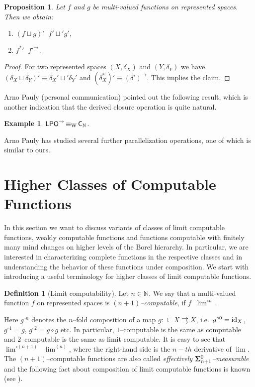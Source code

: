 \documentclass[a4paper]{amsart}
\def\IN{{\mathbb{N}}}
\def\In{\subseteq}
\def\mto{\rightrightarrows}
\def\id{{\rm id}}
\newcommand{\SO}[1]{{{\bf\Sigma}^0_{#1}}}
\def\LPO{\text{\rm\sffamily LPO}}
\def\C{\mbox{\rm\sffamily C}}
\def\LPO{\mbox{\rm\sffamily LPO}}
\def\leqW{\mathop{\leq_{\mathrm{W}}}}
\def\equivW{\mathop{\equiv_{\mathrm{W}}}}
\def\equivSW{\mathop{\equiv_{\mathrm{sW}}}}
\newtheorem{proposition}[theorem]{Proposition}
\theoremstyle{definition}
\newtheorem{definition}[theorem]{Definition}
\newtheorem{example}[theorem]{Example}
\begin{document}
\begin{proposition}
Let $f$ and $g$ be multi-valued functions on represented spaces.
Then we obtain:
\begin{enumerate}
\item $(f\sqcup g)'\equivSW f'\sqcup' g'$,
\item ${f^*}'\equivSW {f'}^\to$.
\end{enumerate}
\end{proposition}
\begin{proof}
For two represented spaces $(X,\delta_X)$ and $(Y,\delta_Y)$ we have
$(\delta_X\sqcup\delta_Y)'\equiv\delta_X'\sqcup'\delta_Y'$ and $(\delta_X^*)'\equiv(\delta')^\to$.
This implies the claim.
\end{proof}

Arno Pauly (personal communication) pointed out the following result, which is another indication that the derived
closure operation is quite natural.

\begin{example} 
\label{ex:LPO-arrow}
$\LPO^\to\equivW\C_\IN$.
\end{example}

Arno Pauly \cite{Pau09a} has studied several further parallelization operations, one of which is similar to ours.


\section{Higher Classes of Computable Functions}
\label{sec:higher-classes}

In this section we want to discuss variants of classes of limit computable functions, weakly computable functions
and functions computable with finitely many mind changes on higher levels of the Borel hierarchy. 
In particular, we are interested in characterizing complete functions in the respective classes 
and in understanding the behavior of these functions under composition.
We start with introducing a useful terminology for higher classes of limit computable functions.

\begin{definition}[Limit computability]
Let $n\in\IN$. We say that a multi-valued function $f$ on represented spaces is 
{\em $(n+1)$--computable}, if $f\leqW\lim^{\circ n}$.
\end{definition}

Here $g^{\circ n}$ denotes the $n$--fold composition of a map $g:\In X\mto X$, 
i.e.\ $g^{\circ 0}=\id_X$,
$g^{\circ 1}=g$, $g^{\circ 2}=g\circ g$ etc. 
In particular, $1$--computable is the same as computable and $2$--computable
is the same as limit computable. 
It is easy to see that $\lim^{\circ(n+1)}\equivSW\lim^{(n)}$, where the right-hand side is the $n-th$ derivative of $\lim$.
The $(n+1)$--computable functions are also called {\em effectively $\SO{n+1}$--measurable} and the following
fact about composition of limit computable functions is known (see \cite{Bra05}).
\end{document}
